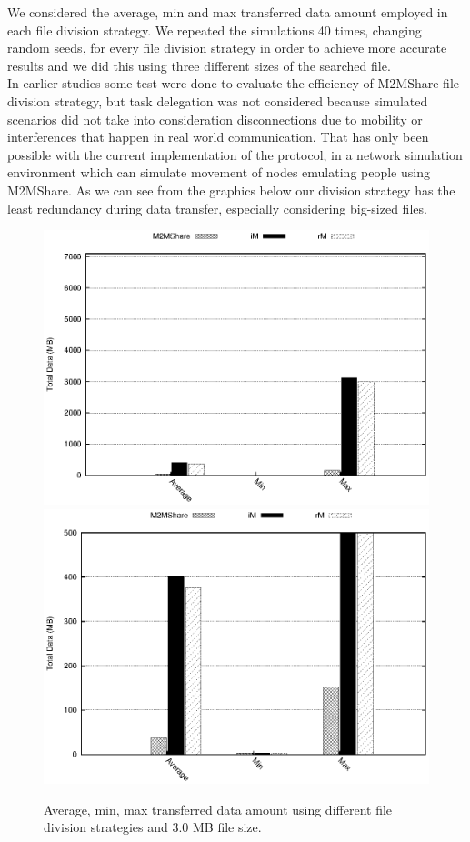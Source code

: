 We considered the average, min and max transferred data amount employed in each file division strategy. We repeated the simulations 40 times, changing random seeds, for every file division strategy in order to achieve more accurate results and we did this using three different sizes of the searched file. 
\\
In earlier studies some test were done to evaluate the efficiency of M2MShare file division strategy, but task delegation was not considered because simulated scenarios did not take into consideration disconnections due to mobility or interferences that happen in real world
communication. That has only been possible with the current implementation of the protocol, in a network simulation environment which can simulate movement of nodes emulating people using M2MShare.
As we can see from the graphics below our division strategy has the least redundancy during data transfer, especially considering big-sized files.

\begin{figure}[htbp]
\centering%
\subfigure%
{\includegraphics[scale=0.9]{grafici/dataDFS_3MB.eps}}\qquad\qquad
\subfigure%
{\includegraphics{grafici/dataDFS_3MB_zoom.eps}}
\caption{Average, min, max transferred data amount using different file division strategies and 3.0 MB file size.\label{graficoDataFDS_3MB}}
\end{figure}

